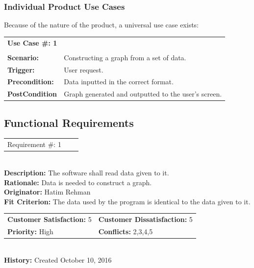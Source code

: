 \documentclass[12pt, titlepage]{article}
\begin{document}
\subsubsection{Individual Product Use Cases}

Because of the nature of the product, a universal use case exists: 

\begin{reqbox}
    \begin{tabular}{l p{10cm}}

	\bf{Use Case \#: 1} & \\
	 & \\
	{\bfseries Scenario: } 	& 	Constructing a graph from a set of data.	\\
	{\bfseries Trigger: }   		& 	User request. 					\\
	{\bfseries Precondition: } 	&	Data inputted in the correct format.		\\
	{\bfseries PostCondition } 	& 	Graph generated and outputted to the user's screen.				\\

    \end{tabular}
\end{reqbox}


\subsection{Functional Requirements}

\begin{reqbox}
\begin{tabular}{ccc}Requirement \#: 1
\end{tabular} \\
\textbf{Description:} The software shall read data given to it.\\
\textbf{Rationale:} Data is needed to construct a graph. \\
\textbf{Originator:} Hatim Rehman \\
\textbf{Fit Criterion:} The data used by the program is identical to the data given to it.\\
\begin{tabular}{ll}
\textbf{Customer Satisfaction:} 5 & \textbf{Customer Dissatisfaction:} 5 \\
\textbf{Priority:} High & \textbf{Conflicts:} 2,3,4,5\\
\end{tabular} \\
\textbf{History:} Created October 10, 2016
\end{reqbox}
\end{document}
